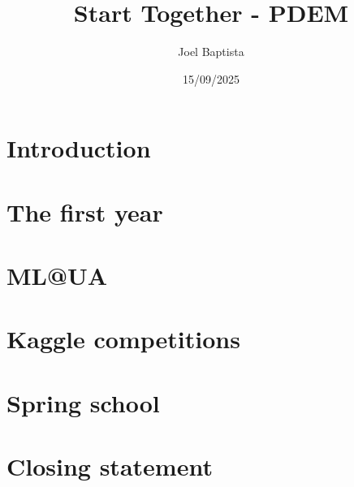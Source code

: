 \documentclass[10pt,xcolor={dvipsnames}]{beamer}
\title[]
{\large Start Together - PDEM}
\subtitle{}
\author[Joel Baptista] %
{Joel Baptista}
\institute[VFU] %
{
  \inst{1}%
  Department of Mechanical Engineering\\
  University of Aveiro, Portugal
  \and
  \inst{2}%
  Institute of Electronics and Informatics Engineering of Aveiro\\
  University of Aveiro, Portugal

}
\date[2025/09/15] %
{15/09/2025}
\begin{document}
\frame{\titlepage}



\section{Introduction}
% 

\section{The first year}


\section{ML@UA}


\section{Kaggle competitions}


\section{Spring school}


\section{Closing statement}



\end{document}
